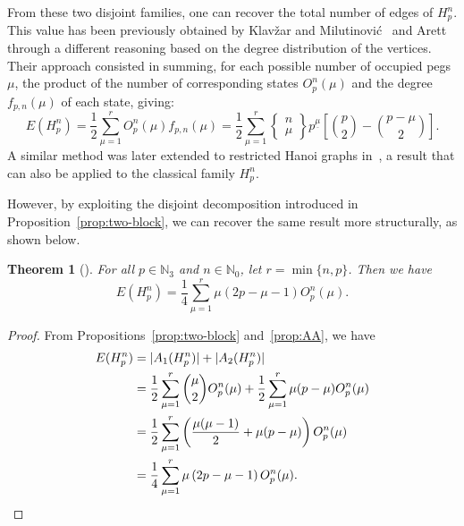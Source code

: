 \documentclass[letterpaper,12pt]{article}
\newtheorem{theorem}{Theorem}
\begin{document}
\noindent
From these two disjoint families, one can recover the total number of edges of $H_p^n$.  
This value has been previously obtained by Klavžar and Milutinović~\cite{klavzarcombinatorics} and Arett~\cite{Arett01062010} through a different reasoning based on the degree distribution of the vertices.  
Their approach consisted in summing, for each possible number of occupied pegs $\mu$, the product of the number of corresponding states $O_p^n(\mu)$ and the degree $f_{p,n}(\mu)$ of each state, giving:
\begin{equation}\label{eq:Ehpn-sum-mu}
    E(H_p^n)=\dfrac{1}{2} \sum_{\mu=1}^{r}O_{p}^{n}(\mu)f_{p,n}(\mu)
    =\dfrac{1}{2}\sum_{\mu=1}^{r}\begin{Bmatrix} n \\ \mu\end{Bmatrix}p^{\underline{\mu}}\left[\binom{p}{2}-\binom{p-\mu}{2}\right].
\end{equation}
A similar method was later extended to restricted Hanoi graphs in~\cite{mehiri2024onrestricted}, a result that can also be applied to the classical family $H_p^n$.


\noindent
However, by exploiting the disjoint decomposition introduced in Proposition~\ref{prop:two-block}, we can recover the same result more structurally, as shown below.

\begin{theorem}[\cite{klavzarcombinatorics,Arett01062010}]\label{theo:edges-sum-forms}  
For all $p \in \mathbb{N}_3$ and $n \in \mathbb{N}_0$, let $r = \min\{n, p\}$. Then we have
\begin{equation}\label{eq:Ehpn-alt}
        E(H_p^n)=\dfrac{1}{4}\sum_{\mu=1}^{r}\mu\left(2p-\mu-1 \right) O_p^n(\mu).
\end{equation}
\end{theorem}
\begin{proof}
From Propositions~\ref{prop:two-block} and~\ref{prop:AA}, we have 
\begin{align*}
E(H_p^n)&=|A_1(H_p^n)|+|A_2(H_p^n)|\\
&=\dfrac{1}{2}\sum_{\mu=1}^{r}\binom{\mu}{2}O_p^n(\mu)+\dfrac{1}{2}\sum_{\mu=1}^{r}\mu(p-\mu)O_p^n(\mu)\\
&=\dfrac{1}{2}\sum_{\mu=1}^{r}\left(\dfrac{\mu(\mu-1)}{2}+\mu(p-\mu) \right) O_p^n(\mu) \\
&=\dfrac{1}{4}\sum_{\mu=1}^{r}\mu\left(2p-\mu-1 \right) O_p^n(\mu).\qedhere
\end{align*}
\end{proof}
\end{document}
